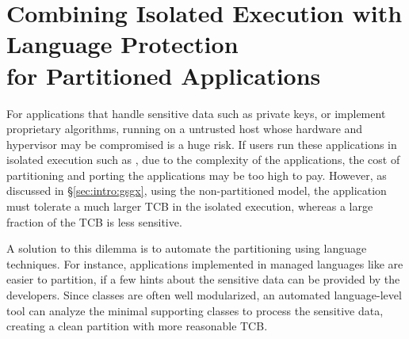 {\section{Combining Isolated Execution with Language Protection\\ for Partitioned Applications}
\label{sec:intro:civet}


For applications that handle sensitive data such as private keys,
or implement proprietary algorithms,
running on a untrusted host whose hardware and hypervisor
may be compromised is a huge risk.
If users run these applications in isolated execution such as \sgx{},
due to the complexity of the applications,
the cost of partitioning and porting the applications may be too high to pay.
However, as discussed in \S\ref{sec:intro:gsgx},
using the non-partitioned model, the application must tolerate a much larger TCB in the isolated execution,
whereas a large fraction of the TCB is less sensitive.

A solution to this dilemma
is to automate the partitioning using language techniques.
For instance, applications implemented in managed languages like \java{}
are easier to partition,
if a few hints about the sensitive data can be provided by the developers.
Since \java{} classes are often well modularized,
an automated language-level tool can analyze the minimal supporting classes to process the sensitive data,
creating a clean partition with more reasonable TCB.

}
